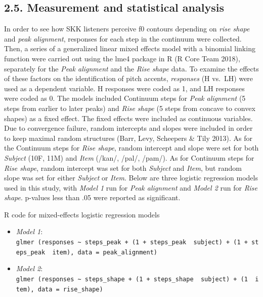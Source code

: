 \documentclass[
  man,floatsintext]{apa6}
\begin{document}
\hypertarget{measurement-and-statistical-analysis}{%
\subsection{2.5. Measurement and statistical analysis}\label{measurement-and-statistical-analysis}}

In order to see how SKK listeners perceive f0 contours depending on \emph{rise shape} and \emph{peak alignment}, responses for each step in the continuum were collected. Then, a series of a generalized linear mixed effects model with a binomial linking function were carried out using the lme4 package in R (R Core Team 2018), separately for the \emph{Peak alignment} and the \emph{Rise shape} data. To examine the effects of these factors on the identification of pitch accents, \emph{responses} (H vs.~LH) were used as a dependent variable. H responses were coded as 1, and LH responses were coded as 0. The models included Continuum steps for \emph{Peak alignment} (5 steps from earlier to later peaks) and \emph{Rise shape} (5 steps from concave to convex shapes) as a fixed effect. The fixed effects were included as continuous variables. Due to convergence failure, random intercepts and slopes were included in order to keep maximal random structures (Barr, Levy, Scheepers \& Tily 2013). As for the Continuum steps for \emph{Rise shape}, random intercept and slope were set for both \emph{Subject} (10F, 11M) and \emph{Item} (/kan/, /pal/, /pam/). As for Continuum steps for \emph{Rise shape}, random intercept was set for both \emph{Subject} and \emph{Item}, but random slope was set for either \emph{Subject} or \emph{Item}. Below are three logistic regression models used in this study, with \emph{Model 1} run for \emph{Peak alignment} and \emph{Model 2} run for \emph{Rise shape}. p-values less than .05 were reported as significant.

R code for mixed-effects logistic regression models

\begin{itemize}
\item
  \emph{Model 1}: \texttt{glmer\ (responses\ \textasciitilde{}\ steps\_peak\ +\ (1\ +\ steps\_peak\ \textbar{}\ subject)\ +\ (1\ +\ steps\_peak\ \textbar{}\ item),\ data\ =\ peak\_alignment)}
\item
  \emph{Model 2}: \texttt{glmer\ (responses\ \textasciitilde{}\ steps\_shape\ +\ (1\ +\ steps\_shape\ \textbar{}\ subject)\ +\ (1\ \textbar{}\ item),\ data\ =\ rise\_shape)}
\end{itemize}
\end{document}
